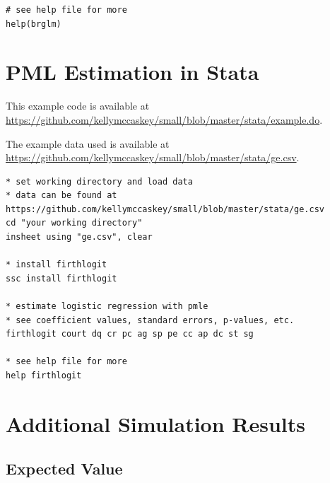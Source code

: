 \documentclass[12pt]{article}
\begin{document}
\begin{appendix}
\begin{footnotesize}
\begin{verbatim}
# see help file for more
help(brglm)
\end{verbatim}
\end{footnotesize}

\section{PML Estimation in Stata}\label{sec:pmle-in-stata}

This example code is available at \href{https://github.com/kellymccaskey/small/blob/master/stata/example.do}{https://github.com/kellymccaskey/small/blob/master/stata/example.do}.

\noindent The example data used is available at \href{https://github.com/kellymccaskey/small/blob/master/stata/GE.dta}{https://github.com/kellymccaskey/small/blob/master/stata/ge.csv}.

\begin{footnotesize}
\begin{verbatim}
* set working directory and load data
* data can be found at https://github.com/kellymccaskey/small/blob/master/stata/ge.csv
cd "your working directory"
insheet using "ge.csv", clear

* install firthlogit
ssc install firthlogit

* estimate logistic regression with pmle
* see coefficient values, standard errors, p-values, etc.
firthlogit court dq cr pc ag sp pe cc ap dc st sg

* see help file for more
help firthlogit

\end{verbatim}
\end{footnotesize}


\section{Additional Simulation Results}\label{sec:app-sims}

\subsection{Expected Value}


\end{appendix}
\end{document}
